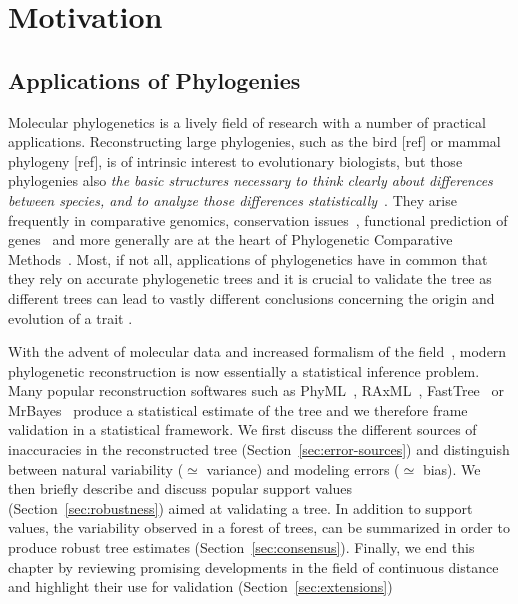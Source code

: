 \section{Motivation} \label{sec:Motivation}

\subsection{Applications of Phylogenies} \label{sec:applications}

Molecular phylogenetics is a lively field of research with a number of practical applications. 
Reconstructing large phylogenies, such as the bird [ref] or mammal phylogeny [ref], is of intrinsic interest 
to evolutionary biologists, but those phylogenies also \emph{the basic structures necessary to think clearly about differences between species, and to analyze those differences statistically}~\citep{Felsenstein2004}. They arise frequently in comparative genomics, conservation issues~\citep{Bordewich2008}, functional prediction of genes~\citep{Eisen1998} and more generally are at the heart of Phylogenetic Comparative Methods~\citep{Revell2008, Pennell2013}. Most, if not all, applications of phylogenetics have in common that they rely on accurate phylogenetic trees and it is crucial to validate the tree as different trees can lead to vastly different conclusions concerning the origin and evolution of a trait \citep{Geneva2015}.  

With the advent of molecular data and increased formalism of the field~\citep{Gascuel2005a}, modern phylogenetic reconstruction is now essentially a statistical inference problem. Many popular reconstruction softwares such as PhyML~\citep{Guindon2003}, RAxML~\citep{Stamatakis2006}, FastTree~\citep{Price2010} or MrBayes~\citep{Ronquist2003} produce a statistical estimate of the tree and we therefore frame validation in a statistical framework. We first discuss the different sources of inaccuracies in the reconstructed tree (Section~\ref{sec:error-sources}) and distinguish between natural variability ($\simeq$ variance) and modeling errors ($\simeq$ bias). We then briefly describe and discuss popular support values (Section~\ref{sec:robustness}) aimed at validating a tree. In addition to support values, the variability observed in a forest of trees, can be summarized in order to produce robust tree estimates (Section~\ref{sec:consensus}). Finally, we end this chapter by reviewing promising developments in the field of continuous distance and highlight their use for validation (Section~\ref{sec:extensions})

